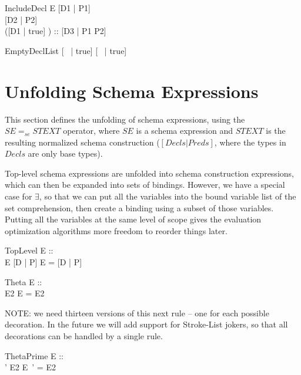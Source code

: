 \documentclass{article}
\newcommand{\sexprUnfoldsTo}{\mathrel{=_{se}}}
\newcommand{\declListUnfoldsTo}{\mathrel{=_d}}
\begin{document}
\begin{zedrule}{IncludeDecl}
   E \sexprUnfoldsTo [D1 | P1] \\
   [D | true] \declListUnfoldsTo [D2 | P2] \\
   ([D1 | true] \land [D2 | true]) :: \power [D3 | true] 
\derives
   [E; D | true] \declListUnfoldsTo [D3 |  P1 \land P2]
\end{zedrule}

\begin{zedrule}{EmptyDeclList}
   [~ | true] \declListUnfoldsTo [~ | true]
\end{zedrule}


\section{Unfolding Schema Expressions}

This section defines the unfolding of schema expressions,
using the $SE \sexprUnfoldsTo STEXT$ operator, where $SE$
is a schema expression and $STEXT$ is the resulting normalized
schema construction ($[Decls|Preds]$, where the types in $Decls$
are only base types).

Top-level schema expressions are unfolded into schema construction
expressions, which can then be expanded into sets of bindings.
However, we have a special case for $\exists$, so that we can
put all the variables into the bound variable list of the
set comprehension, then create a binding using a subset of
those variables.  Putting all the variables at the same level
of scope gives the evaluation optimization algorithms more
freedom to reorder things later.

\begin{zedrule}{TopLevel}
  E :: \power [D2 | true] \\
  E  \sexprUnfoldsTo [D | P]
\derives
  E = [D | P]
\end{zedrule}

\begin{zedrule}{Theta}
  E :: \power [D | true] \\
  \theta [D | true] \is E2
\derives
  \theta E = E2
\end{zedrule}

NOTE: we need thirteen versions of this next rule -- one for
each possible decoration.   In the future we will add
support for Stroke-List jokers, so that all decorations can
be handled by a single rule.

\begin{zedrule}{ThetaPrime}
  E :: \power [D | true] \\
  \theta [D | true] ' \is E2
\derives
  \theta E~' = E2
\end{zedrule}
\end{document}
